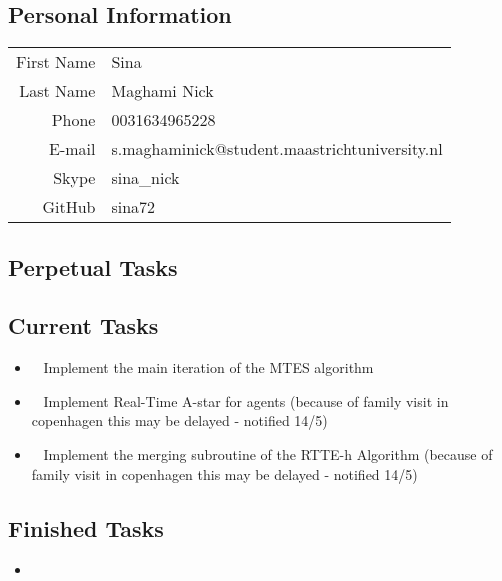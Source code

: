 \subsection{Personal Information}
\begin{table}[h!]
	\begin{tabular}{rl}
	First Name 	& Sina\\
	Last Name	& Maghami Nick\\
	Phone		& 0031634965228\\
	E-mail		& s.maghaminick@student.maastrichtuniversity.nl\\
	Skype		& sina\_nick\\
	GitHub		& sina72
\end{tabular}
\end{table}

\subsection{Perpetual Tasks}

\subsection{Current Tasks}
\begin{itemize}
	\item~
	Implement the main iteration of the MTES algorithm
	\item~
	Implement Real-Time A-star for agents
		\subitem (because of family visit in copenhagen this may be delayed - notified 14/5)
	\item~
	Implement the merging subroutine of the RTTE-h Algorithm
		\subitem (because of family visit in copenhagen this may be delayed - notified 14/5)
\end{itemize}

\subsection{Finished Tasks}
\begin{itemize}
	\item 
\end{itemize}
